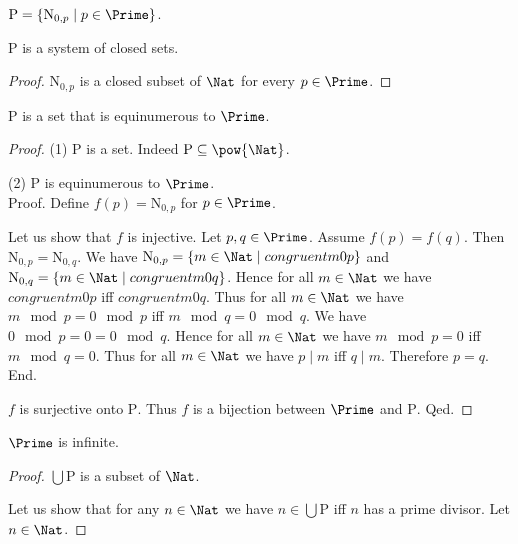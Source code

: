 \documentclass{stex}
\newcommand{\arithseq}[2]{\mathrm{N}_{#1,#2}}
\newcommand{\Ps}{\mathrm{P}}
\begin{document}
  \begin{forthel}
    \begin{definition}
      $\Ps = \{ \arithseq{0}{p} \mid p \in \Prime \}$.
    \end{definition}

    \begin{lemma}
      $\Ps$ is a system of closed sets.
    \end{lemma}
    \begin{proof}
      $\arithseq{0}{p}$ is a closed subset of $\Nat$ for every $p \in \Prime$.
    \end{proof}

    \begin{lemma}
      $\Ps$ is a set that is equinumerous to $\Prime$.
    \end{lemma}
    \begin{proof}
      (1) $\Ps$ is a set.
      Indeed $\Ps \subseteq \pow{\Nat}$.

      (2) $\Ps$ is equinumerous to $\Prime$. \\
      Proof.
        Define $f(p) = \arithseq{0}{p}$ for $p \in \Prime$.

        Let us show that $f$ is injective.
          Let $p, q \in \Prime$.
          Assume $f(p) = f(q)$.
          Then $\arithseq{0}{p} = \arithseq{0}{q}$.
          We have $\arithseq{0}{p} = \{ m \in \Nat \mid congruent{m}{0}{p} \}$ and
          $\arithseq{0}{q} = \{ m \in \Nat \mid congruent{m}{0}{q} \}$.
          Hence for all $m \in \Nat$ we have $congruent{m}{0}{p}$ iff
          $congruent{m}{0}{q}$.
          Thus for all $m \in \Nat$ we have $m \mod p = 0 \mod p$ iff
          $m \mod q = 0 \mod q$.
          We have $0 \mod p = 0 = 0 \mod q$.
          Hence for all $m \in \Nat$ we have $m \mod p = 0$ iff $m \mod q = 0$.
          Thus for all $m \in \Nat$ we have $p \mid m$ iff $q \mid m$.
          Therefore $p = q$.
        End.

        $f$ is surjective onto $\Ps$.
        Thus $f$ is a bijection between $\Prime$ and $\Ps$.
      Qed.
    \end{proof}

    \begin{theorem}[Furstenberg]
      $\Prime$ is infinite.
    \end{theorem}
    \begin{proof}
      $\bigcup \Ps$ is a subset of $\Nat$.

      Let us show that for any $n \in \Nat$ we have $n \in \bigcup \Ps$ iff $n$
      has a prime divisor.
        Let $n \in \Nat$.


\end{proof}
\end{forthel}
\end{document}
